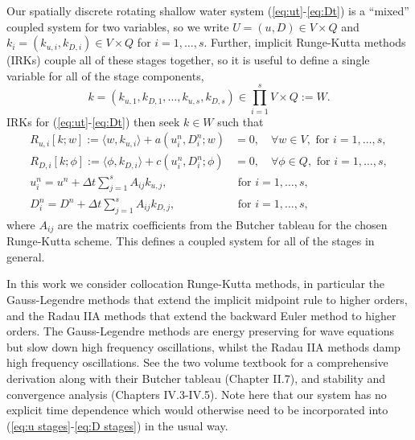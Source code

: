 \documentclass[a4paper, 12pt]{article}
\newcommand{\revisedB}[1]{#1}
\begin{document}
Our spatially discrete rotating
shallow water system (\ref{eq:ut}-\ref{eq:Dt}) is a ``mixed'' coupled
system for two variables, so we write $U=(u,D)\in V\times Q$ and $k_i
= (k_{u,i},k_{D,i})\in V\times Q$ for $i=1,\ldots,s$. Further,
implicit Runge-Kutta methods (IRKs) couple all of these stages together, so it
is useful to define a single variable for all of the stage components,
\[
k = (k_{u,1},k_{D,1},\ldots,k_{u,s},k_{D,s}) \in
\prod_{i=1}^s V\times Q := W.
\]
IRKs for (\ref{eq:ut}-\ref{eq:Dt}) then 
seek $k\in W$ such that
\begin{align}
    \label{eq:u stages}
    R_{u,i}[k;w] := \langle w, k_{u,i} \rangle +  a\left(
    u^n_i,D^n_i;w\right)
  & = 0,  
  \quad \forall w \in V,\mbox{ for }i=1,\ldots,s, \\
  \label{eq:D stages}
  R_{D,i}[k;\phi] := \langle \phi, k_{D,i} \rangle +  c\left(u^n_i,D^n_i; \phi\right)
  & = 0, \quad \forall \phi \in Q, \mbox{ for }i=1,\ldots,s,\\
  u^n_i = u^n + \Delta t\sum_{j=1}^sA_{ij}k_{u,j}, & \mbox{ for }i=1,\ldots,s,\\
  D^n_i = D^n + \Delta t\sum_{j=1}^sA_{ij}k_{D,j}, & \mbox{ for }i=1,\ldots,s,
\end{align}
where $A_{ij}$ are the matrix coefficients from the Butcher
tableau for the chosen Runge-Kutta scheme. This defines a coupled
system for all of the stages in general.

In this work
we consider collocation Runge-Kutta methods, in particular the
Gauss-Legendre methods that extend the implicit midpoint rule to
higher orders, and the Radau IIA methods that extend the backward Euler
method to higher orders. The Gauss-Legendre methods are energy
preserving for wave equations but slow down high frequency
oscillations, whilst the Radau IIA methods damp high frequency
oscillations.  \revisedB{See the two volume textbook \citet{hairer1993solving,wanner1996solving} for a comprehensive
derivation along with their Butcher
tableau (Chapter II.7), and stability and convergence analysis (Chapters IV.3-IV.5).}  Note here that our system has no explicit time dependence
which would otherwise need to be incorporated into (\ref{eq:u
  stages}-\ref{eq:D stages}) in the usual way.
\end{document}
